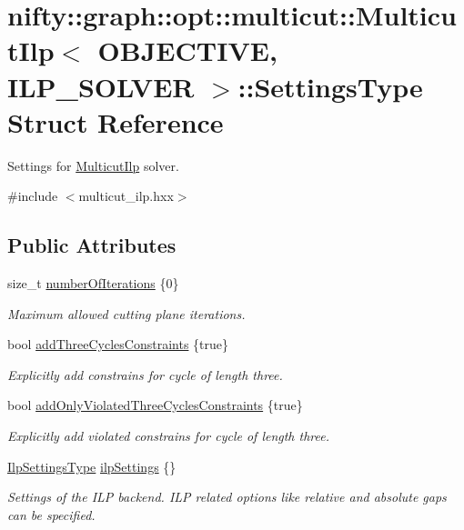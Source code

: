 \hypertarget{structnifty_1_1graph_1_1opt_1_1multicut_1_1MulticutIlp_1_1SettingsType}{}\section{nifty\+:\+:graph\+:\+:opt\+:\+:multicut\+:\+:Multicut\+Ilp$<$ O\+B\+J\+E\+C\+T\+I\+VE, I\+L\+P\+\_\+\+S\+O\+L\+V\+ER $>$\+:\+:Settings\+Type Struct Reference}
\label{structnifty_1_1graph_1_1opt_1_1multicut_1_1MulticutIlp_1_1SettingsType}


Settings for \hyperlink{classnifty_1_1graph_1_1opt_1_1multicut_1_1MulticutIlp}{Multicut\+Ilp} solver.  




{\ttfamily \#include $<$multicut\+\_\+ilp.\+hxx$>$}

\subsection*{Public Attributes}
\begin{DoxyCompactItemize}
\item 
size\+\_\+t \hyperlink{structnifty_1_1graph_1_1opt_1_1multicut_1_1MulticutIlp_1_1SettingsType_afa45b6db286d8000398eff9f719fc5dd}{number\+Of\+Iterations} \{0\}
\begin{DoxyCompactList}\small\item\em Maximum allowed cutting plane iterations. \end{DoxyCompactList}\item 
bool \hyperlink{structnifty_1_1graph_1_1opt_1_1multicut_1_1MulticutIlp_1_1SettingsType_a4a91caa517c62ba5098317f4ac8702c8}{add\+Three\+Cycles\+Constraints} \{true\}
\begin{DoxyCompactList}\small\item\em Explicitly add constrains for cycle of length three. \end{DoxyCompactList}\item 
bool \hyperlink{structnifty_1_1graph_1_1opt_1_1multicut_1_1MulticutIlp_1_1SettingsType_ad759353f0698ef7051d150f8a7d3d933}{add\+Only\+Violated\+Three\+Cycles\+Constraints} \{true\}
\begin{DoxyCompactList}\small\item\em Explicitly add violated constrains for cycle of length three. \end{DoxyCompactList}\item 
\hyperlink{classnifty_1_1graph_1_1opt_1_1multicut_1_1MulticutIlp_ad46bf56538766a3bbf4d5783727e1e7c}{Ilp\+Settings\+Type} \hyperlink{structnifty_1_1graph_1_1opt_1_1multicut_1_1MulticutIlp_1_1SettingsType_a02f867e50e587e0a1d74b93a34bd94b8}{ilp\+Settings} \{\}
\begin{DoxyCompactList}\small\item\em Settings of the I\+LP backend.  I\+LP related options like relative and absolute gaps can be specified. \end{DoxyCompactList}\end{DoxyCompactItemize}


